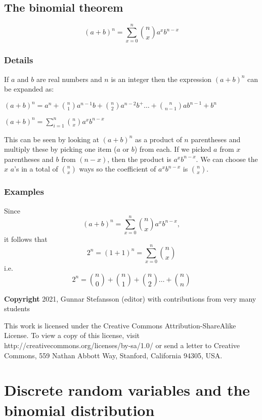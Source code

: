 \documentclass[12pt,a4paper]{article}
\theoremstyle{regla}
\theoremstyle{remark}
\theoremstyle{definition}
\theoremstyle{nonumberbreak}
\begin{document}
\subsection{The binomial theorem}
\begin{fbox}
\begin{minipage}{0.97\textwidth}
$$(a+b)^n  = \sum_{x=0}^n {n \choose x} a^xb^{n-x}$$
\end{minipage}
\end{fbox}
\subsubsection{Details}
If $a$ and $b$ are real numbers and $n$ is an integer then the expression $(a+b)^n$  can be expanded as:

$ (a+b)^n = a^n+ {n \choose 1}a^{n-1}b +  {n \choose 2}a^{n-2}b^ + \ldots +{n \choose n-1}ab^{n-1}+b^n$  

$ (a+b)^n  = \sum_{i=1}^n  {n \choose x}a^xb^{n-x}$   

This can be seen by looking at $(a+b)^n$ as a product of $n$ parentheses
and multiply these by picking one item ($a$ or $b$) from each. If we picked
$a$ from $x$ parentheses and $b$ from $(n-x)$, then the product is
$a^x b^{n-x}$. We can choose the $x$ $a$'s in a total of $\binom{n}{x}$
ways so the coefficient of $a^x b^{n-x}$ is $\binom{n}{x}$.

\subsubsection{Examples}
\begin{xmpl}
Since
$$(a+b)^n  = \sum_{x=0}^n {n \choose x} a^xb^{n-x},$$
it follows that
$$2^n = (1+1)^n  = \sum_{x=0}^n {n \choose x}$$
i.e.
$$2^n = {n \choose 0} + {n \choose 1} + {n \choose 2}\ldots+ {n \choose n}$$

\end{xmpl}

{\bf Copyright}
2021, Gunnar Stefansson (editor) with contributions from very many students

This work is licensed under the Creative Commons
Attribution-ShareAlike License. To view a copy of this license, visit
http://creativecommons.org/licenses/by-sa/1.0/ or send a letter to
Creative Commons, 559 Nathan Abbott Way, Stanford, California 94305,
USA.
\clearpage
\section{Discrete random variables and the binomial distribution}
\end{document}
